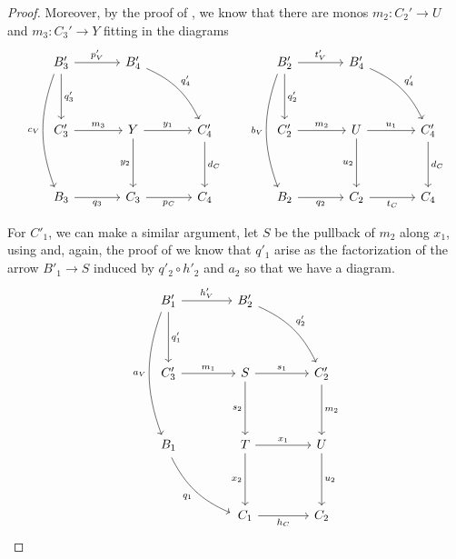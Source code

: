 \begin{proof}
	Moreover, by the proof of , we know that there are monos $m_2:C_2'\to U$ and $m_3:C_3'\to Y$ fitting in the diagrams
	\[\begin{tikzcd}[row sep=18, column sep = 18]
	{B'_3} && {B'_4} \\
	\\
	{C'_3} && Y && {C'_4} \\
	\\
	{B_3} && {C_3} && {C_4}
	\arrow["{p'_V}", from=1-1, to=1-3]
	\arrow["{q'_3}", from=1-1, to=3-1]
	\arrow["{q'_4}", from=1-3, to=3-5, bend left = 20]
	\arrow["{m_3}", from=3-1, to=3-3]
	\arrow["{y_1}", from=3-3, to=3-5]
	\arrow["{y_2}"', from=3-3, to=5-3]
	\arrow["{d_C}", from=3-5, to=5-5]
	\arrow["{q_3}"', from=5-1, to=5-3]
	\arrow["{p_C}"', from=5-3, to=5-5]
        \arrow["{c_V}"', from=1-1, to=5-1, bend right = 20, shift right=1]
	\end{tikzcd}\qquad\begin{tikzcd}[row sep=18, column sep = 18]
	{B'_2} && {B'_4} \\
	\\
	{C'_2} && U && {C'_4} \\
	\\
	{B_2} && {C_2} && {C_4}
	\arrow["{t'_V}", from=1-1, to=1-3]
	\arrow["{q'_2}", from=1-1, to=3-1]
	\arrow["{q'_4}", from=1-3, to=3-5, bend left = 20]
	\arrow["{m_2}", from=3-1, to=3-3]
	\arrow["{u_1}", from=3-3, to=3-5]
	\arrow["{u_2}"', from=3-3, to=5-3]
	\arrow["{d_C}", from=3-5, to=5-5]
	\arrow["{q_2}"', from=5-1, to=5-3]
	\arrow["{t_C}"', from=5-3, to=5-5]
        \arrow["{b_V}"', from=1-1, to=5-1, bend right = 20, shift right = 1]
	\end{tikzcd}\]

	For $C'_1$, we can make a similar argument, let $S$ be the pullback of $m_2$ along $x_1$, using  and, again, the proof of  we know that $q'_1$ arise as the factorization of the arrow $B'_1\to S$ induced by $q'_2\circ h'_2$ and $a_2$ so that we have a diagram.
	\[\begin{tikzcd}[row sep = 20, column sep =20]
	{B'_1} && {B'_2} \\
	\\
	{C'_3} && S && {C'_2} \\
	\\
	{B_1} && T && U \\
	\\
	&& {C_1} && {C_2}
	\arrow["{h'_V}", from=1-1, to=1-3]
	\arrow["{q'_1}", from=1-1, to=3-1]
	\arrow["{q'_2}", from=1-3, to=3-5, bend left = 20]
	\arrow["{m_1}", from=3-1, to=3-3]
	\arrow["{s_1}", from=3-3, to=3-5]
	\arrow["{s_2}"', from=3-3, to=5-3]
	\arrow["{m_2}", from=3-5, to=5-5]
	\arrow["{q_1}"', from=5-1, to=7-3, bend right = 20, shift right = 1]
	\arrow["{x_1}", from=5-3, to=5-5]
	\arrow["{x_2}"', from=5-3, to=7-3]
	\arrow["{u_2}", from=5-5, to=7-5]
	\arrow["{h_C}"', from=7-3, to=7-5]
        \arrow["{a_V}"', from=1-1, to=5-1, bend right = 20, shift right = 1]
	\end{tikzcd}\]
	

\end{proof}
